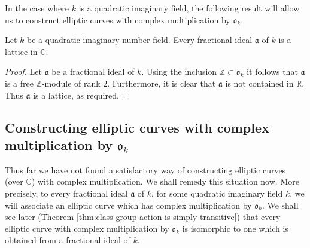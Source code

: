 In the case where $k$ is a quadratic imaginary field, the following result will allow
us to construct elliptic curves with complex multiplication by $\mathfrak{o}_{k}$.

\begin{lem}
  \label{lem:frac-ideals-are-lattices}
  Let $k$ be a quadratic imaginary number field.  Every fractional ideal
  $\mathfrak{a}$ of $k$ is a lattice in $\mathbb{C}$.
\end{lem}

\begin{proof}
  Let $\mathfrak{a}$ be a fractional ideal of $k$.  Using the inclusion $\mathbb{Z}
  \subset \mathfrak{o}_{k}$ it follows that $\mathfrak{a}$ is a free
  $\mathbb{Z}$-module of rank $2$.  Furthermore, it is clear that $\mathfrak{a}$ is
  not contained in $\mathbb{R}$. Thus $\mathfrak{a}$ is a lattice, as required.
\end{proof}

\subsection{Constructing elliptic curves with complex multiplication by
  $\mathfrak{o}_{k}$}
\label{sec:constr-ellipt-curv-with-cm-by-o}

Thus far we have not found a satisfactory way of constructing elliptic curves (over
$\mathbb{C}$) with complex multiplication.  We shall remedy this situation now.  More
precisely, to every fractional ideal $\mathfrak{a}$ of $k$, for some quadratic
imaginary field $k$, we will associate an elliptic curve which has complex
multiplication by $\mathfrak{o}_{k}$.  We shall see later (Theorem
\ref{thm:class-group-action-is-simply-transitive}) that every elliptic curve with
complex multiplication by $\mathfrak{o}_{k}$ is isomorphic to one which is obtained
from a fractional ideal of $k$.

